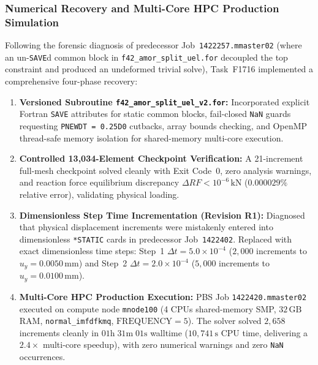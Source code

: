 \subsubsection{Numerical Recovery and Multi-Core HPC Production Simulation}
Following the forensic diagnosis of predecessor Job~\texttt{1422257.mmaster02} (where an un-\texttt{SAVE}d common block in \texttt{f42\_amor\_split\_uel.for} decoupled the top constraint and produced an undeformed trivial solve), Task~F1716 implemented a comprehensive four-phase recovery:
\begin{enumerate}
  \item \textbf{Versioned Subroutine \texttt{f42\_amor\_split\_uel\_v2.for}:} Incorporated explicit Fortran \texttt{SAVE} attributes for static common blocks, fail-closed \texttt{NaN} guards requesting \texttt{PNEWDT = 0.25D0} cutbacks, array bounds checking, and OpenMP thread-safe memory isolation for shared-memory multi-core execution.
  \item \textbf{Controlled 13,034-Element Checkpoint Verification:} A 21-increment full-mesh checkpoint solved cleanly with Exit Code~0, zero analysis warnings, and reaction force equilibrium discrepancy $\Delta RF < 10^{-6}\,\mathrm{kN}$ ($0.000029\%$ relative error), validating physical loading.
  \item \textbf{Dimensionless Step Time Incrementation (Revision R1):} Diagnosed that physical displacement increments were mistakenly entered into dimensionless \texttt{*STATIC} cards in predecessor Job~\texttt{1422402}. Replaced with exact dimensionless time steps: Step~1 $\Delta t = 5.0\times 10^{-4}$ ($2{,}000$ increments to $u_y = 0.0050\,\mathrm{mm}$) and Step~2 $\Delta t = 2.0\times 10^{-4}$ ($5{,}000$ increments to $u_y = 0.0100\,\mathrm{mm}$).
  \item \textbf{Multi-Core HPC Production Execution:} PBS Job \texttt{1422420.mmaster02} executed on compute node \texttt{mnode100} (4 CPUs shared-memory SMP, $32\,\mathrm{GB}$ RAM, \texttt{normal\_imfdfkmq}, $\mathrm{FREQUENCY}=5$). The solver solved $2{,}658$ increments cleanly in $01\mathrm{h}\;31\mathrm{m}\;01\mathrm{s}$ walltime ($10{,}741\,\mathrm{s}$ CPU time, delivering a $2.4\times$ multi-core speedup), with zero numerical warnings and zero \texttt{NaN} occurrences.
\end{enumerate}

